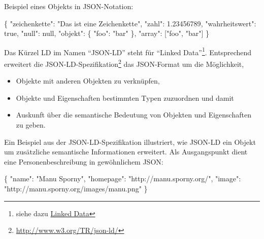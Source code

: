 \documentclass[,a4paper]{article}
\newenvironment{Shaded}{}{}
\newcommand{\DataTypeTok}[1]{\textcolor[rgb]{0.56,0.13,0.00}{{#1}}}
\newcommand{\DecValTok}[1]{\textcolor[rgb]{0.25,0.63,0.44}{{#1}}}
\newcommand{\FloatTok}[1]{\textcolor[rgb]{0.25,0.63,0.44}{{#1}}}
\newcommand{\StringTok}[1]{\textcolor[rgb]{0.25,0.44,0.63}{{#1}}}
\newcommand{\NormalTok}[1]{{#1}}
\begin{document}
Beispiel eines Objekts in JSON-Notation:

\begin{Shaded}
\begin{Highlighting}[]
\NormalTok{\{}
    \DataTypeTok{"zeichenkette"}\NormalTok{: }\StringTok{"Das ist eine Zeichenkette"}\NormalTok{,}
    \DataTypeTok{"zahl"}\NormalTok{: }\FloatTok{1.23456789}\NormalTok{,}
    \DataTypeTok{"wahrheitswert"}\NormalTok{: }\DecValTok{true}\NormalTok{,}
    \DataTypeTok{"null"}\NormalTok{: }\DecValTok{null}\NormalTok{,}
    \DataTypeTok{"objekt"}\NormalTok{: \{}
        \DataTypeTok{"foo"}\NormalTok{: }\StringTok{"bar"}
    \NormalTok{\},}
    \DataTypeTok{"array"}\NormalTok{: [}\StringTok{"foo"}\NormalTok{, }\StringTok{"bar"}\NormalTok{]}
\NormalTok{\}}
\end{Highlighting}
\end{Shaded}


Das Kürzel LD im Namen ``JSON-LD'' steht für ``Linked Data''\footnote{siehe
  dazu \hyperref[linkedux5fdata]{Linked Data}}. Entsprechend erweitert
die JSON-LD-Spezifikation\footnote{\url{http://www.w3.org/TR/json-ld/}}
das JSON-Format um die Möglichkeit,

\begin{itemize}
\itemsep1pt\parskip0pt
\item
  Objekte mit anderen Objekten zu verknüpfen,
\item
  Objekte und Eigenschaften bestimmten Typen zuzuordnen und damit
\item
  Auskunft über die semantische Bedeutung von Objekten und Eigenschaften
  zu geben.
\end{itemize}

Ein Beispiel aus der JSON-LD-Spezifikation illustriert, wie JSON-LD ein
Objekt um zusätzliche semantische Informationen erweitert. Als
Ausgangspunkt dient eine Personenbeschreibung in gewöhnlichem JSON:

\begin{Shaded}
\begin{Highlighting}[]
\NormalTok{\{}
  \DataTypeTok{"name"}\NormalTok{: }\StringTok{"Manu Sporny"}\NormalTok{,}
  \DataTypeTok{"homepage"}\NormalTok{: }\StringTok{"http://manu.sporny.org/"}\NormalTok{,}
  \DataTypeTok{"image"}\NormalTok{: }\StringTok{"http://manu.sporny.org/images/manu.png"}
\NormalTok{\}}
\end{Highlighting}
\end{Shaded}
\end{document}
